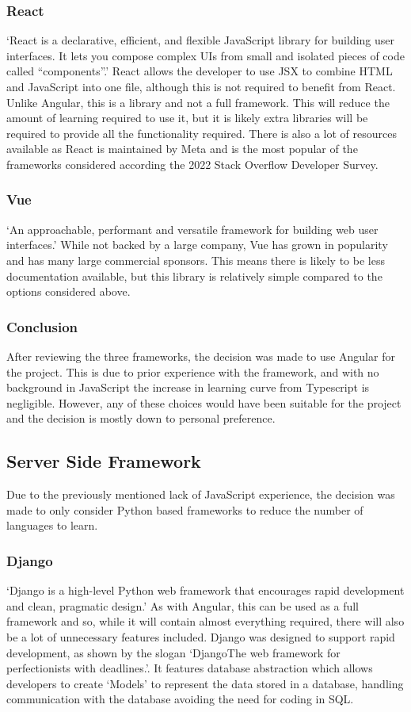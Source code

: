 \subsubsection*{React}
`React is a declarative, efficient, and flexible JavaScript library for building user interfaces. It lets you compose 
complex UIs from small and isolated pieces of code called “components”.'\cite{TutorialIntroReact} React allows the 
developer to use JSX to combine HTML and JavaScript into one file, although this is not required to benefit from React. 
Unlike Angular, this is a library and not a full framework. This will reduce the amount of learning required to use it,
but it is likely extra libraries will be required to provide all the functionality required. There is also a lot of 
resources available as React is maintained by Meta and is the most popular of the frameworks considered according the 
2022 Stack Overflow Developer Survey\cite{StackOverflowDeveloper}.
\subsubsection*{Vue}
`An approachable, performant and versatile framework for building web user interfaces.'\cite{VueJsProgressive} While not
 backed by a large company, Vue has grown in popularity and has many large commercial sponsors. This means there is 
likely to be less documentation available, but this library is relatively simple compared to the options considered 
above. 
\subsubsection*{Conclusion}
After reviewing the three frameworks, the decision was made to use Angular for the project. This is due to prior 
experience with the framework, and with no background in JavaScript the increase in learning curve from Typescript is 
negligible. However, any of these choices would have been suitable for the project and the decision is mostly down to 
personal preference.
\subsection{Server Side Framework}
Due to the previously mentioned lack of JavaScript experience, the decision was made to only consider Python based 
frameworks to reduce the number of languages to learn.
\subsubsection*{Django}
`Django is a high-level Python web framework that encourages rapid development and clean, pragmatic design.'\cite{Django}
As with Angular, this can be used as a full framework and so, while it will contain almost everything required, there 
will also be a lot of unnecessary features included. Django was designed to support rapid development, as shown by the 
slogan `DjangoThe web framework for perfectionists with deadlines.'\cite{Django}. It features database abstraction which
 allows developers to create `Models' to represent the data stored in a database, handling communication with the 
database avoiding the need for coding in SQL.
